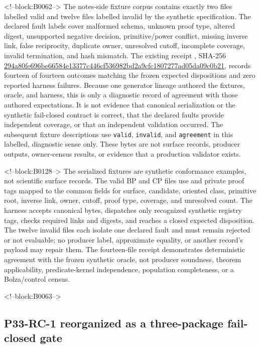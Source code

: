 \documentclass[11pt,a4paper]{article}
\begin{document}
<!--block:B0062-->
The notes-side fixture corpus contains exactly two files labelled valid and twelve files labelled invalid by the synthetic specification. The declared fault labels cover malformed schema, unknown proof type, altered digest, unsupported negative decision, primitive/power conflict, missing inverse link, false reciprocity, duplicate owner, unresolved cutoff, incomplete coverage, invalid termination, and hash mismatch. The existing receipt , SHA-256 \url{294a80fe696be66584e13377c446cf536982bd2a9cfc1807277ad05da09c0b21}, records fourteen of fourteen outcomes matching the frozen expected dispositions and zero reported harness failures. Because one generator lineage authored the fixtures, oracle, and harness, this is only a diagnostic record of agreement with those authored expectations. It is not evidence that canonical serialization or the synthetic fail-closed contract is correct, that the declared faults provide independent coverage, or that an independent validation occurred. The subsequent fixture descriptions use \texttt{valid}, \texttt{invalid}, and \texttt{agreement} in this labelled, diagnostic sense only. These bytes are not surface records, producer outputs, owner-census results, or evidence that a production validator exists.

<!--block:B0128-->
The serialized fixtures are synthetic conformance examples, not scientific surface records. The valid BP and CP files use  and private proof tags mapped to the common fields for surface, candidate, oriented class, primitive root, inverse link, owner, cutoff, proof type, coverage, and unresolved count. The harness accepts canonical bytes, dispatches only recognized synthetic registry tags, checks required links and digests, and reaches a closed expected disposition. The twelve invalid files each isolate one declared fault and must remain rejected or not evaluable; no producer label, approximate equality, or another record's payload may repair them. The fourteen-file receipt demonstrates deterministic agreement with the frozen synthetic oracle, not producer soundness, theorem applicability, predicate-kernel independence, population completeness, or a Bolza/control census.

<!--block:B0063-->
\hypertarget{p33-rc-1-reorganized-as-a-three-package-fail-closed-gate}{%
\subsection{P33-RC-1 reorganized as a three-package fail-closed gate}\label{p33-rc-1-reorganized-as-a-three-package-fail-closed-gate}}
\end{document}
